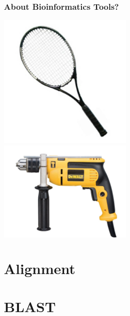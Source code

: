\begin{frame}
  \frametitle{About Bioinformatics Tools?}
  \begin{center}
    \includegraphics[width=0.5\textwidth]{images/racquet} 
    \includegraphics[width=0.5\textwidth]{images/drill}       
  \end{center}
\end{frame}      
  
\section{Alignment} 



%

\section{BLAST}




%

